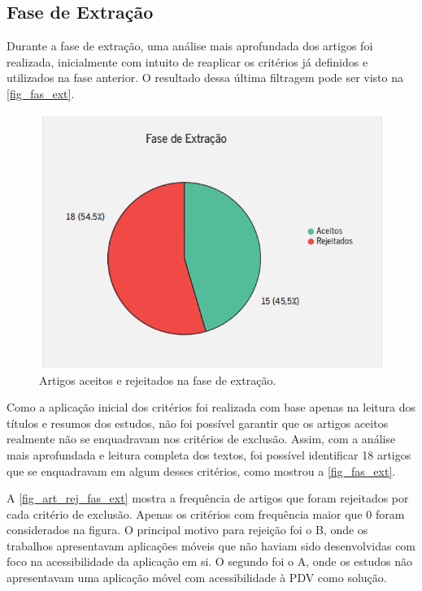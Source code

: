 \newpage{}

\subsection{Fase de Extração}

Durante a fase de extração, uma análise mais aprofundada dos artigos foi realizada, inicialmente com intuito de reaplicar os critérios já definidos e utilizados na fase anterior.
O resultado dessa última filtragem pode ser visto na \autoref{fig_fas_ext}.

\begin{figure}[htb]
	\caption{\label{fig_fas_ext}Artigos aceitos e rejeitados na fase de extração.}
	\begin{center}
	    \includegraphics[scale=0.85]{Imagens/msl/fase_extracao_artigos.png}
	\end{center}
\end{figure}

Como a aplicação inicial dos critérios foi realizada com base apenas na leitura dos títulos e resumos dos estudos, não foi possível garantir que os artigos aceitos realmente não se enquadravam nos critérios de exclusão.
Assim, com a análise mais aprofundada e leitura completa dos textos, foi possível identificar 18 artigos que se enquadravam em algum desses critérios, como mostrou a \autoref{fig_fas_ext}.

\newpage

A \autoref{fig_art_rej_fas_ext} mostra a frequência de artigos que foram rejeitados por cada critério de exclusão.
Apenas os critérios com frequência maior que 0 foram considerados na figura.
O principal motivo para rejeição foi o B, onde os trabalhos apresentavam aplicações móveis que não haviam sido desenvolvidas com foco na acessibilidade da aplicação em si.
O segundo foi o A, onde os estudos não apresentavam uma aplicação móvel com acessibilidade à PDV como solução.

